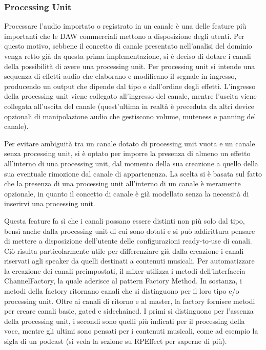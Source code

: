 \documentclass[a4paper,12pt]{report}
\begin{document}
\subsubsection{Processing Unit}
Processare l’audio importato o registrato in un canale è una delle feature più importanti che le DAW commerciali mettono a disposizione degli utenti. Per questo motivo, sebbene il concetto di canale presentato nell’analisi del dominio venga retto già da questa prima implementazione, si è deciso di dotare i canali della possibilità di avere una processing unit. Per processing unit si intende una sequenza di effetti audio che elaborano e modificano il segnale in ingresso, producendo un output che dipende dal tipo e dall’ordine degli effetti. 
L’ingresso della processing unit viene collegato all’ingresso del canale, mentre l’uscita viene collegata all’uscita del canale (quest’ultima in realtà è preceduta da altri device opzionali di manipolazione audio che gestiscono volume, muteness e panning del canale).

Per evitare ambiguità tra un canale dotato di processing unit vuota e un canale senza processing unit, si è optato per imporre la presenza di almeno un effetto all’interno di una processing unit, dal momento della sua creazione a quello della sua eventuale rimozione dal canale di appartenenza.
La scelta si è basata sul fatto che la presenza di una processing unit all’interno di un canale è meramente opzionale, in quanto il concetto di canale è già modellato senza la necessità di inserirvi una processing unit.

Questa feature fa sì che i canali possano essere distinti non più solo dal tipo, bensì anche dalla processing unit di cui sono dotati e si può addirittura pensare di mettere a disposizione dell’utente delle configurazioni ready-to-use di canali. Ciò risulta particolarmente utile per differenziare già dalla creazione i canali riservati agli speaker da quelli destinati a contenuti musicali.
Per automatizzare la creazione dei canali preimpostati, il mixer utilizza i metodi dell’interfaccia ChannelFactory, la quale aderisce al pattern Factory Method. In sostanza, i metodi della factory ritornano canali che si distinguono per il loro tipo e/o processing unit. Oltre ai canali di ritorno e al master, la factory fornisce metodi per creare canali basic, gated e sidechained. I primi si distinguono per l’assenza della processing unit, i secondi sono quelli più indicati per il processing della voce, mentre gli ultimi sono pensati per i contenuti musicali, come ad esempio la sigla di un podcast (si veda la sezione su RPEffect per saperne di più).
\end{document}
